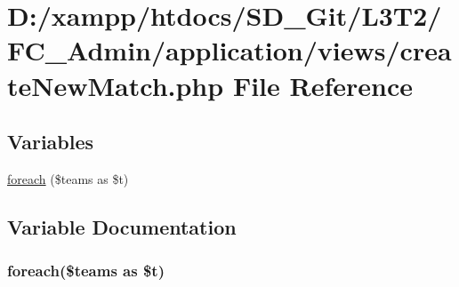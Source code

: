 \hypertarget{create_new_match_8php}{}\section{D\+:/xampp/htdocs/\+S\+D\+\_\+\+Git/\+L3\+T2/\+F\+C\+\_\+\+Admin/application/views/create\+New\+Match.php File Reference}
\label{create_new_match_8php}
\subsection*{Variables}
\begin{DoxyCompactItemize}
\item 
\hyperlink{create_new_match_8php_a2f6e0e3338c699622bae4550e2677b82}{foreach} (\$teams as \$t)
\end{DoxyCompactItemize}


\subsection{Variable Documentation}
\hypertarget{create_new_match_8php_a2f6e0e3338c699622bae4550e2677b82}{}
\subsubsection[{foreach}]{\setlength{\rightskip}{0pt plus 5cm}foreach(\$teams as \$t)}\label{create_new_match_8php_a2f6e0e3338c699622bae4550e2677b82}
